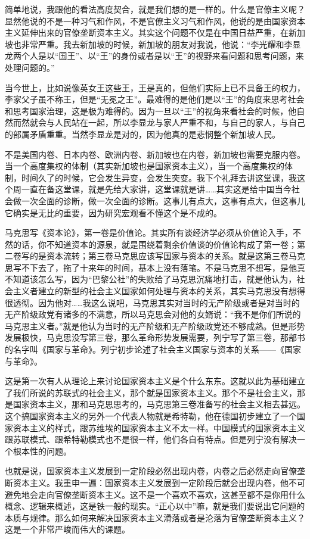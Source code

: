 \documentclass[UTF8, 12pt, a4paper]{ctexrep}
\begin{document}
简单地说，我跟他的看法高度契合，就是我们想的是一样的。什么是官僚主义呢？显然他说的不是一种习气和作风，不是官僚主义习气和作风，他说的是由国家资本主义延伸出来的官僚垄断资本主义。其实这个问题不仅是在中国日益严重，在新加坡也非常严重。我去新加坡的时候，新加坡的朋友对我说，他说：“李光耀和李显龙两个人是以“国王”、以“王”的身份或者是以“王”的视野来看问题和思考问题，来处理问题的。”

当今世上，比如说像英女王这些王，王是真的，但他们实际上已不具备王的权力，李家父子虽不称王，但是“无冕之王”。最难得的是他们是以“王”的角度来思考社会和思考国家治理，这是极为难得的。因为一旦以“王”的视角来看社会的时候，他自然而然就会与人民站在一起，所以李显龙与家人严重不和，与自己的家人，与自己的部属矛盾重重。当然李显龙是对的，因为他真的是悲悯整个新加坡人民。

不是美国内卷、日本内卷、欧洲内卷、新加坡也在内卷，新加坡也需要克服内卷。当一个高度集权的体制（其实新加坡也是国家资本主义），当一个高度集权的体制，时间久了的时候，它会发生异变，会发生突变。我下个礼拜去讲这堂课，我这个周一直在备这堂课，就是先给大家讲，这堂课就是讲……其实这是给中国当今社会做一次全面的诊断，做一次全面的诊断。这事儿有点大，这事有点大，但这事儿它确实是无比的重要，因为研究宏观看不懂这个是不成的。

马克思写《资本论》，第一卷是价值论。其实所有谈经济学必须从价值论入手，不然的话，你不知道资本的源泉，就是围绕着剩余价值谈的价值论构成了第一卷；第二卷写的是资本流转；第三卷马克思应该写国家与资本的关系。就是这第三卷马克思写不下去了，拖了十来年的时间，基本上没有落笔。不是马克思不想写，是他真不知道该怎么写，因为“巴黎公社”的失败给了马克思沉痛地打击，就是他认为，社会主义者建立的新型的社会主义国家如何处理与资本的关系，其实马克思没有想得很透彻。因为他对……我这么说吧，马克思其实对当时的无产阶级或者是对当时的无产阶级政党有诸多的不满意，所以马克思会对他的女婿说：“我不是你们所说的马克思主义者。”就是他认为当时的无产阶级和无产阶级政党还不够成熟。但是形势发展极快，马克思没写第三卷，那么革命形势发展需要，列宁写了第三卷，那部书的名字叫《国家与革命》。列宁初步论述了社会主义国家与资本的关系——《国家与革命》。

这是第一次有人从理论上来讨论国家资本主义是个什么东东。这就以此为基础建立了我们所说的苏联式的社会主义，那个就是国家资本主义。那个不是社会主义，那是国家资本主义，那和马克思思考的，马克思第三卷准备写的社会主义相去甚远。这个搞国家资本主义的另外一个代表人物就是希特勒，他在德国初步建立了一个国家资本主义的样式，跟苏维埃的国家资本主义不太一样。中国模式的国家资本主义跟苏联模式、跟希特勒模式也不是很一样，他们各自有特点。但是列宁没有解决一个根本性的问题。

也就是说，国家资本主义发展到一定阶段必然出现内卷，内卷之后必然走向官僚垄断资本主义。我重申一遍：国家资本主义发展到一定阶段后就会出现内卷，他不可避免地会走向官僚垄断资本主义。这不是一个喜欢不喜欢，这甚至都不是你用什么概念、逻辑来概述，这是铁一般的现实。“正心以中”嘛，就是我们要说出它问题的本质与规律。那么如何来解决国家资本主义滑落或者是沦落为官僚垄断资本主义？这是一个非常严峻而伟大的课题。
\end{document}
